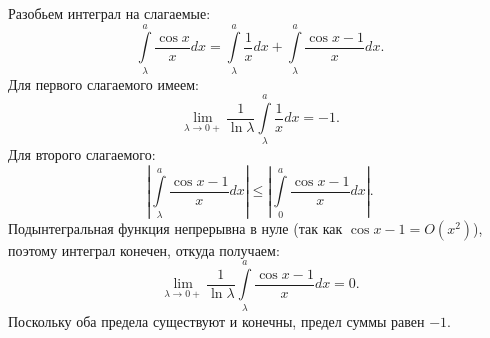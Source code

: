 \documentclass{article}
\begin{document}
Разобьем интеграл на слагаемые:
$$\int\limits_\lambda^a \frac{\cos x}{x} dx = \int\limits_\lambda^a \frac{1}{x} dx + \int\limits_\lambda^a \frac{\cos x - 1}{x} dx.$$
Для первого слагаемого имеем:
$$\lim\limits_{\lambda \to 0+} \frac{1}{\ln \lambda} \int\limits_\lambda^a \frac{1}{x} dx = -1.$$
Для второго слагаемого:
$$\left| \int\limits_\lambda^a \frac{\cos x - 1}{x} dx \right| \leqslant \left| \int\limits_0^a \frac{\cos x - 1}{x} dx \right|.$$
Подынтегральная функция непрерывна в нуле (так как $\cos x - 1 = O(x^2)$), поэтому интеграл конечен, откуда получаем:
$$\lim\limits_{\lambda \to 0+} \frac{1}{\ln \lambda} \int\limits_\lambda^a \frac{\cos x - 1}{x} dx = 0.$$
Поскольку оба предела существуют и конечны, предел суммы равен $-1$.
\end{document}
